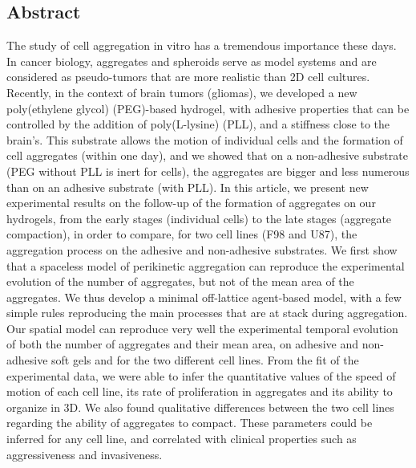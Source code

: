 \documentclass[11pt,a4paper]{article}
\begin{document}
\subsection*{Abstract}
The study of cell aggregation in vitro has a tremendous importance these days. In cancer biology, aggregates and spheroids serve as model systems and are considered as pseudo-tumors that are more realistic than 2D cell cultures. Recently, in the context of brain tumors (gliomas), we developed a new poly(ethylene glycol) (PEG)-based hydrogel, with adhesive properties that can be controlled by the addition of poly(L-lysine) (PLL), and a stiffness close to the brain's. This substrate allows the motion of individual cells and the formation of cell aggregates (within one day), and we showed that on a non-adhesive substrate (PEG without PLL is inert for cells), the aggregates are bigger and less numerous than on an adhesive substrate (with PLL). In this article, we present new experimental results on the follow-up of the formation of aggregates on our hydrogels, from the early stages (individual cells) to the late stages (aggregate compaction), in order to compare, for two cell lines (F98 and U87), the aggregation process on the adhesive and non-adhesive substrates. We first show that a spaceless model of perikinetic aggregation can reproduce the experimental evolution of the number of aggregates, but not of the mean area of the aggregates. We thus develop a minimal off-lattice agent-based model, with a few simple rules reproducing the main processes that are at stack during aggregation. Our spatial model can reproduce very well the experimental temporal evolution of both the number of aggregates and their mean area, on adhesive and non-adhesive soft gels and for the two different cell lines. From the fit of the experimental data, we were able to infer the quantitative values of the speed of motion of each cell line, its rate of proliferation in aggregates and its ability to organize in 3D. We also found qualitative differences between the two cell lines regarding the ability of aggregates to compact. These parameters could be inferred for any cell line, and correlated with clinical properties such as aggressiveness and invasiveness. 
\end{document}
